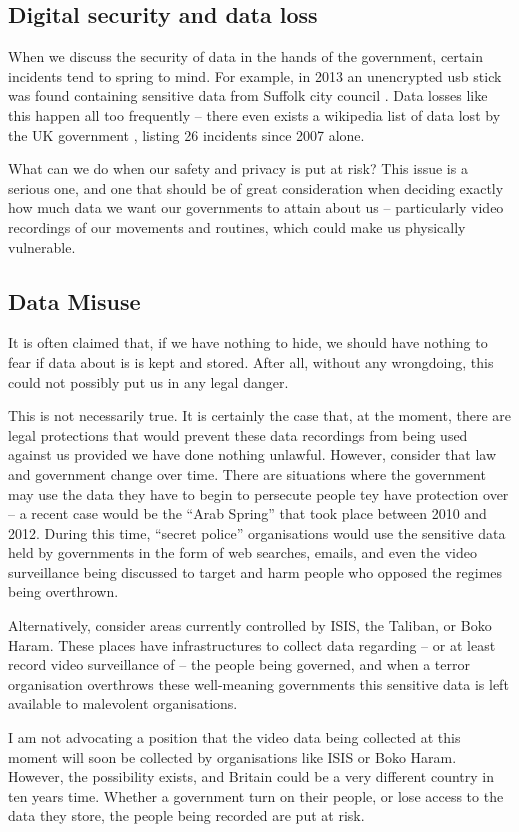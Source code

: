 \documentclass[10pt, draft]{article}
\begin{document}
\subsection{Digital security and data loss}\par
When we discuss the security of data in the hands of the government, certain incidents tend to spring to mind. For example, in 2013 an unencrypted usb stick was found containing sensitive data from Suffolk city council \cite{suffolk-losses}. Data losses like this happen all too frequently -- there even exists a wikipedia list of data lost by the UK government \cite{gvmt-list}, listing 26 incidents since 2007 alone. \par
What can we do when our safety and privacy is put at risk? This issue is a serious one, and one that should be of great consideration when deciding exactly how much data we want our governments to attain about us -- particularly video recordings of our movements and routines, which could make us physically vulnerable. \par

\subsection{Data Misuse}\par
It is often claimed that, if we have nothing to hide, we should have nothing to fear if data about is is kept and stored. After all, without any wrongdoing, this could not possibly put us in any legal danger. \par
This is not necessarily true. It is certainly the case that, at the moment, there are legal protections that would prevent these data recordings from being used against us provided we have done nothing unlawful. However, consider that law and government change over time. There are situations where the government may use the data they have to begin to persecute people tey have protection over -- a recent case would be the ``Arab Spring'' that took place between 2010 and 2012. During this time, ``secret police'' organisations would use the sensitive data held by governments in the form of web searches, emails, and even the video surveillance being discussed to target and harm people who opposed the regimes being overthrown. \par
Alternatively, consider areas currently controlled by ISIS, the Taliban, or Boko Haram. These places have infrastructures to collect data regarding -- or at least record video surveillance of -- the people being governed, and when a terror organisation overthrows these well-meaning governments this sensitive data is left available to malevolent organisations. \par
I am not advocating a position that the video data being collected at this moment will soon be collected by organisations like ISIS or Boko Haram. However, the possibility exists, and Britain could be a very different country in ten years time. Whether a government turn on their people, or lose access to the data they store, the people being recorded are put at risk. \par
\end{document}

